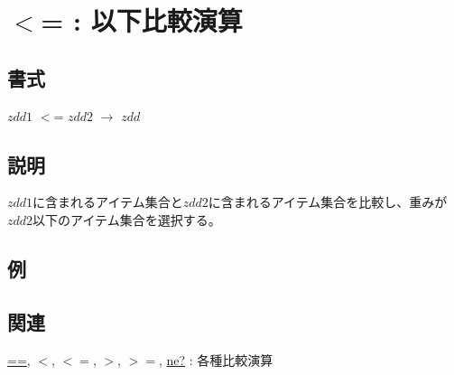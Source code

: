 
\section{$<$= : 以下比較演算\label{sect:le}}
\subsection*{書式}
$zdd1$ $<$= $zdd2$ $\rightarrow$ $zdd$

\subsection*{説明}
$zdd1$に含まれるアイテム集合と$zdd2$に含まれるアイテム集合を比較し、重みが$zdd2$以下のアイテム集合を選択する。

\subsection*{例}


\subsection*{関連}
\hyperref[sect:eq]{==},
\hyperref[sect:lt]{$<$},
\hyperref[sect:le]{$<=$},
\hyperref[sect:gt]{$>$},
\hyperref[sect:ge]{$>=$},
\hyperref[sect:ne]{ne?} : 各種比較演算


